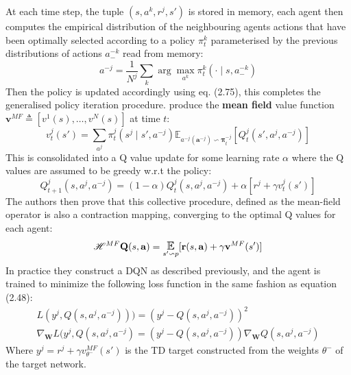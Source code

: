 At each time step, the tuple $(s, {a^k}, {r^j}, s')$ is stored in memory,
each agent then computes the empirical distribution of the neighbouring
agents actions that have been optimally selected according to a policy 
$\pi^k_t$ parameterised by the previous distributions of actions $a^{-k}_-$ read from memory:
\begin{equation}
    a^{-j} = \frac{1}{N^j} \sum_k \arg \max_{a^k} \pi^k_t(\cdot \mid s, a^{-k}_-)
\end{equation}
Then the policy is updated accordingly using eq. (2.75), this completes the generalised
policy iteration procedure. \cite{Yang2018} produce the \textbf{mean field} value function 
$\mathbf{v}^{MF} \triangleq [v^1(s),\hdots, v^N(s)]$ at time $t$:
\begin{equation}
    v^j_t(s')= \sum_{a^j}\pi^j_t(s^j \mid s', a^{-j}) \mathbb{E}_{a^{-j}(\mathbf{a}^{-j}) \backsim \boldsymbol \pi_t^{-j}}[Q^j_t(s',a^j,a^{-j})]
\end{equation}
This is consolidated into a Q value update for some learning rate $\alpha$ where the Q values are
assumed to be greedy w.r.t the policy:
\begin{equation}
    Q^j_{t+1}(s,a^j,a^{-j})= (1-\alpha)Q^j_t(s,a^j,a^{-j}) +\alpha[r^j+ \gamma v^j_t(s')]
\end{equation}
The authors then prove that this collective procedure, defined as the mean-field operator
is also a contraction mapping, converging to the optimal Q values for each agent:
\begin{equation}
    \mathscr{H}^{MF} \mathbf{Q}(s, \mathbf{a}) = \E_{s'\backsim p}[\mathbf{r}(s,\mathbf{a}) +\gamma \mathbf{v}^{MF}(s')]
\end{equation}
In practice they construct a DQN as described previously, and the agent is trained to
minimize the following loss function in the same fashion as equation (2.48):
\begin{equation}
    \begin{gathered}
        L(y^j, Q(s, a^j, a^{-j}))) = (y^j - Q(s, a^j, a^{-j}))^2 \\
        \nabla_{\mathbf{W}} L(y^j, Q(s, a^j, a^{-j}) = (y^j - Q(s, a^j, a^{-j})) \nabla_{\mathbf{W}} Q(s, a^j, a^{-j})
    \end{gathered}
\end{equation}
Where $y^j = r^j + \gamma v^{MF}_{\theta^-}(s')$ is the TD target constructed from the weights $\theta^-$ of the target network.

